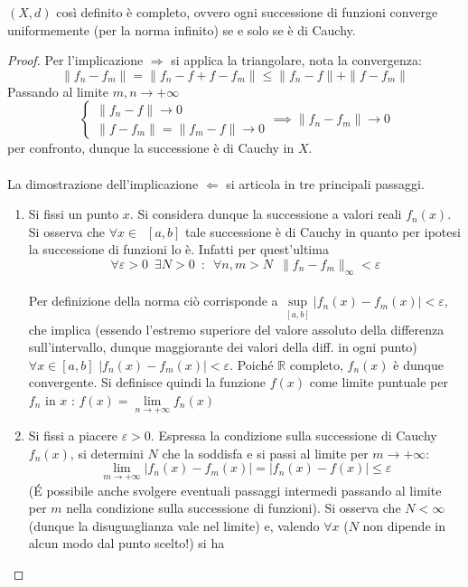 \documentclass[10pt, oneside]{book}
\theoremstyle{plain}
\begin{document}
\begin{ther}
$(X,d)$ così definito è completo, ovvero ogni successione di funzioni converge uniformemente (per la norma infinito) se e solo se è di Cauchy.
\end{ther}
\begin{proof}
Per l'implicazione $\Rightarrow$ si applica la triangolare, nota la convergenza:
\[\| f_n - f_m \| = \| f_n - f + f - f_m \| \leq \| f_n - f \| + \| f - f_m \|\]
Passando al limite $\displaystyle m, n \rightarrow +\infty$
\[\begin{cases}
\displaystyle \| f_n - f \| \rightarrow 0\\
\displaystyle \| f - f_m \| = \| f_m - f \| \rightarrow 0
\end{cases} \implies \| f_n - f_m \| \rightarrow 0\]
per confronto, dunque la successione è di Cauchy in $X$.\\~\\
La dimostrazione dell'implicazione $\Leftarrow$ si articola in tre principali passaggi.
\begin{enumerate}
\item Si fissi un punto $x$. Si considera dunque la successione a valori reali $f_n(x)$. Si osserva che $\forall x \in \enspace [a,b]$ tale successione è di Cauchy in quanto per ipotesi la successione di funzioni lo è. Infatti per quest'ultima
\[\forall \varepsilon > 0 \enspace \exists N > 0 \enspace : \enspace \forall n,m > N \enspace \|f_n - f_m\|_\infty < \varepsilon\]
\\Per definizione della norma ciò corrisponde a $\displaystyle \sup\limits_{[a,b]}|f_n(x) - f_m(x)| < \varepsilon$, che implica (essendo l'estremo superiore del valore assoluto della differenza sull'intervallo, dunque maggiorante dei valori della diff. in ogni punto) $\forall x \in [a,b]$ $|f_n(x) - f_m(x)| < \varepsilon$. Poiché $\mathbb{R}$ completo, $f_n(x)$ è dunque convergente. Si definisce quindi la funzione $f(x)$ come limite puntuale per $f_n$ in $x$ : $\displaystyle f(x) = \lim\limits_{n \rightarrow +\infty} f_n(x)$
\item Si fissi a piacere $\varepsilon > 0$. Espressa la condizione sulla successione di Cauchy $f_n(x)$, si determini $N$ che la soddisfa e si passi al limite per $m \rightarrow + \infty$:
\[\lim\limits_{m \rightarrow +\infty}|f_n(x) - f_m(x)| = |f_n(x) - f(x)| \leq \varepsilon\]
(\'E possibile anche svolgere eventuali passaggi intermedi passando al limite per $m$ nella condizione sulla successione di funzioni). Si osserva che $N < \infty$ (dunque la disuguaglianza vale nel limite) e, valendo $\forall x$ ($N$ non dipende in alcun modo dal punto scelto!) si ha

\end{enumerate}
\end{proof}
\end{document}
